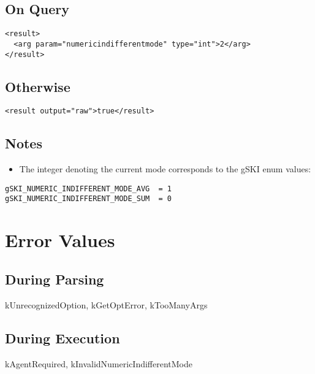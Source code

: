 \documentclass[10pt]{article}
\begin{document}
\subsection*{ On Query }
\begin{verbatim}
<result>
  <arg param="numericindifferentmode" type="int">2</arg>
</result>

\end{verbatim}
\subsection*{ Otherwise }
\begin{verbatim}
<result output="raw">true</result>

\end{verbatim}
\subsection*{ Notes }
\begin{itemize}
\item  The integer denoting the current mode corresponds to the gSKI enum values: 

\end{itemize}
\begin{verbatim}
gSKI_NUMERIC_INDIFFERENT_MODE_AVG  = 1
gSKI_NUMERIC_INDIFFERENT_MODE_SUM  = 0

\end{verbatim}
\section*{ Error Values }
\subsection*{ During Parsing }


 kUnrecognizedOption, kGetOptError, kTooManyArgs
\subsection*{ During Execution }


 kAgentRequired, kInvalidNumericIndifferentMode
\end{document}
